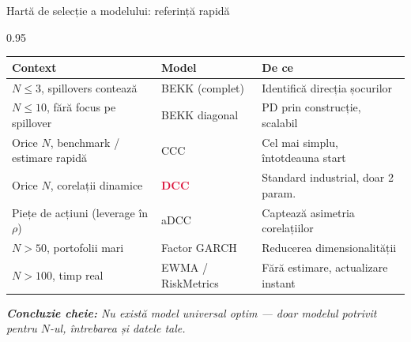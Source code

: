 \documentclass[9pt, aspectratio=169, t]{beamer}
\begin{document}
\begin{frame}{Hartă de selecție a modelului: referință rapidă}
    \begin{cminipage}{0.95\textwidth}
    {\footnotesize
    \renewcommand{\arraystretch}{1.4}
    \begin{tabular}{@{}p{5.5cm}p{3cm}p{4.5cm}@{}}
        \toprule
        \textbf{Context} & \textbf{Model} & \textbf{De ce} \\
        \midrule
        $N \leq 3$, spillovers contează & BEKK (complet) & Identifică direcția șocurilor \\
        $N \leq 10$, fără focus pe spillover & BEKK diagonal & PD prin construcție, scalabil \\
        Orice $N$, benchmark / estimare rapidă & CCC & Cel mai simplu, întotdeauna start \\
        Orice $N$, corelații dinamice & \textcolor{Crimson}{\textbf{DCC}} & Standard industrial, doar 2 param. \\
        Piețe de acțiuni (leverage în $\rho$) & aDCC & Captează asimetria corelațiilor \\
        $N > 50$, portofolii mari & Factor GARCH & Reducerea dimensionalității \\
        $N > 100$, timp real & EWMA / RiskMetrics & Fără estimare, actualizare instant \\
        \bottomrule
    \end{tabular}
    \vspace{3mm}

    \textit{\textbf{Concluzie cheie:} Nu există model universal optim --- doar modelul potrivit pentru $N$-ul, întrebarea și datele tale.}
    }
    \end{cminipage}
\end{frame}

\end{document}
